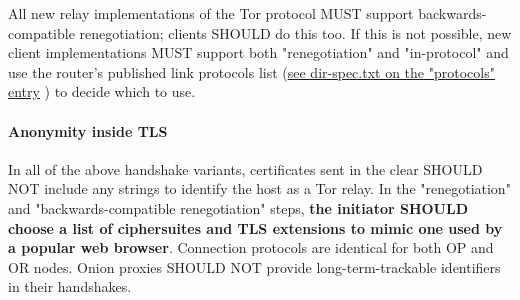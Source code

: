    All new relay implementations of the Tor protocol MUST support
   backwards-compatible renegotiation; clients SHOULD do this too.  If this is not possible, new client implementations MUST support both "renegotiation" and "in-protocol" and use the router's published link protocols list (\href{https://gitweb.torproject.org/torspec.git/tree/dir-spec.txt}{see dir-spec.txt on the "protocols" entry} ) to decide which to use.

\paragraph{Anonymity inside TLS}
In all of the above handshake variants, certificates sent in the clear SHOULD NOT include any strings to identify the host as a Tor relay. In the "renegotiation" and "backwards-compatible renegotiation" steps, \textbf{the initiator SHOULD choose a list of ciphersuites and TLS extensions to mimic one used by a popular web browser}. Connection protocols are identical for both OP and OR nodes. Onion proxies SHOULD NOT provide long-term-trackable identifiers in their handshakes.




